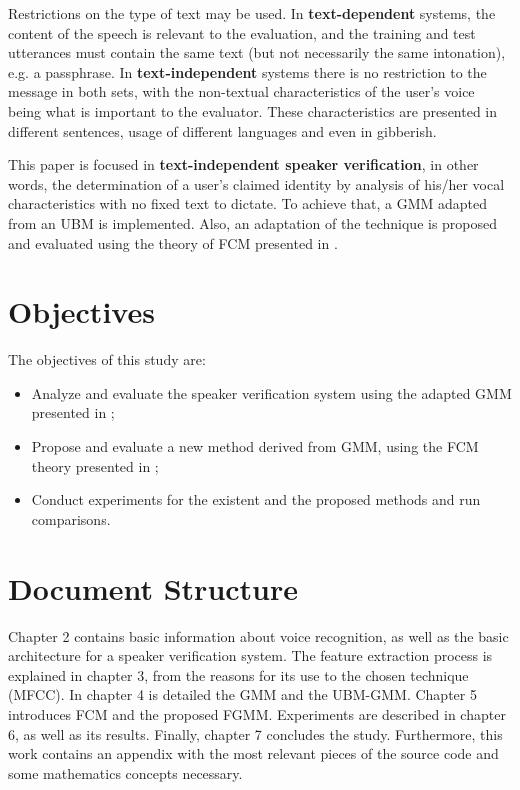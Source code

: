 Restrictions on the type of text may be used. In \textbf{text-dependent} systems, the content of the speech is relevant to the evaluation, and the training and test utterances must contain the same text (but not necessarily the same intonation), e.g. a passphrase. In \textbf{text-independent} systems there is no restriction to the message in both sets, with the non-textual characteristics of the user's voice being what is important to the evaluator. These characteristics are presented in different sentences, usage of different languages and even in gibberish.

This paper is focused in \textbf{text-independent speaker verification}, in other words, the determination of a user's claimed identity by analysis of his/her vocal characteristics with no fixed text to dictate. To achieve that, a GMM adapted from an UBM \autocite{reynolds.quatieri.dunn.2000} is implemented. Also, an adaptation of the technique is proposed and evaluated using the theory of FCM presented in \autocite{gao.zhou.pu.2013}.

\section{Objectives}

The objectives of this study are:

\begin{itemize}\itemsep0pt
    \item Analyze and evaluate the speaker verification system using the adapted GMM presented in \autocite{reynolds.quatieri.dunn.2000};
    \item Propose and evaluate a new method derived from GMM, using the FCM theory presented in \autocite{gao.zhou.pu.2013};
    \item Conduct experiments for the existent and the proposed methods and run comparisons.
\end{itemize}

\section{Document Structure}

Chapter 2 contains basic information about voice recognition, as well as the basic architecture for a speaker verification system. The feature extraction process is explained in chapter 3, from the reasons for its use to the chosen technique (MFCC). In chapter 4 is detailed the GMM and the UBM-GMM. Chapter 5 introduces FCM and the proposed FGMM. Experiments are described in chapter 6, as well as its results. Finally, chapter 7 concludes the study. Furthermore, this work contains an appendix with the most relevant pieces of the source code and some mathematics concepts necessary.